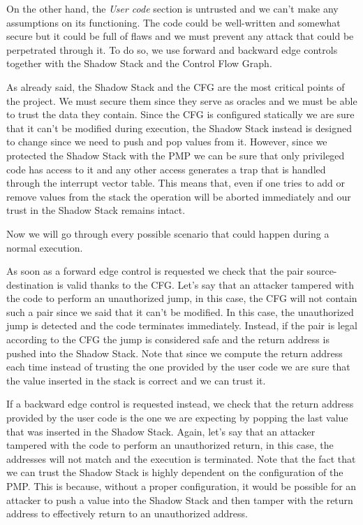 On the other hand, the \textit{User code} section is untrusted and we can't make
any assumptions on its functioning. The code could be well-written and somewhat
secure but it could be full of flaws and we must prevent any attack that could
be perpetrated through it. To do so, we use forward and backward edge controls
together with the Shadow Stack and the Control Flow Graph.

As already said, the Shadow Stack and the CFG are the most critical points of the
project. We must secure them since they serve as oracles and we must be able to
trust the data they contain. Since the CFG is configured statically we are sure that
it can't be modified during execution, the Shadow Stack instead is designed to
change since we need to push and pop values from it. However, since we protected
the Shadow Stack with the PMP we can be sure that only privileged code has
access to it and any other access generates a trap that is handled through the
interrupt vector table. This means that, even if one tries to add or remove
values from the stack the operation will be aborted immediately and our trust in
the Shadow Stack remains intact.

Now we will go through every possible scenario that could happen during a normal
execution.

As soon as a forward edge control is requested we check that the pair source-destination
is valid thanks to the CFG. Let's say that an attacker tampered with the code to
perform an unauthorized jump, in this case, the CFG will not contain such a pair
since we said that it can't be modified. In this case, the unauthorized jump is detected
and the code terminates immediately. Instead, if the pair is legal according to the
CFG the jump is considered safe and the return address is pushed into the Shadow
Stack. Note that since we compute the return address each time instead of
trusting the one provided by the user code we are sure that the value inserted
in the stack is correct and we can trust it.

If a backward edge control is requested instead, we check that the return address
provided by the user code is the one we are expecting by popping the last value that
was inserted in the Shadow Stack. Again, let's say that an attacker tampered with
the code to perform an unauthorized return, in this case, the addresses will not
match and the execution is terminated. Note that the fact that we can trust the
Shadow Stack is highly dependent on the configuration of the PMP. This is because,
without a proper configuration, it would be possible for an attacker to push a value
into the Shadow Stack and then tamper with the return address to effectively return
to an unauthorized address.

